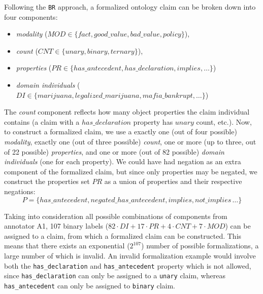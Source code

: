Following the \texttt{BR} approach, a formalized ontology claim can be broken
down into four components:
\begin{itemize}
	\item \emph{modality} ($\mathit{MOD} \in \{\mathit{fact},
		\mathit{good\_value}, \mathit{bad\_value}, \mathit{policy}\}$), 
	\item \emph{count} ($\mathit{CNT} \in \{\mathit{unary},
		\mathit{binary},  \mathit{ternary}\}$),
	\item \emph{properties} ($\mathit{PR} \in \{\mathit{has\_antecedent},
		\mathit{has\_declaration}, \mathit{implies}, \dots\}$)
	\item \emph{domain individuals} ($\mathit{DI} \in \{\mathit{marijuana},
		\mathit{legalized\_marijuana}, \mathit{mafia\_bankrupt},
		\dots\}$)
\end{itemize}
The \emph{count} component reflects how many object properties the claim individual
contains (a claim with a $\mathit{has\_declaration}$ property has $\mathit{unary}$ count, etc.).
Now, to construct a formalized claim, we use a exactly one (out of four
possible) \emph{modality}, exactly one (out of three possible) \emph{count},
one or more (up to three, out of 22 possible) \emph{properties}, and one
or more (out of 82 possible) \emph{domain individuals} (one for each property). 
We could have had negation as an extra component of the formalized claim, but
since only properties may be negated, we construct the properties set $PR$ as a
union of properties and their respective negations: 
$$
P = \{\mathit{has\_antecedent}, 
\mathit{negated\_has\_antecedent}, \mathit{implies}, \mathit{not\_implies}\, \dots\}
$$

Taking into consideration all possible combinations of components from
annotator A1, 107 binary labels ($82 \cdot \mathit{DI} + 17 \cdot \mathit{PR} + 4\cdot
\mathit{CNT} + 7 \cdot \mathit{MOD}$) can be assigned to a claim, from which a
formalized claim can be constructed.  This means that there  exists an
exponential ($2^{107}$) number of possible formalizations, a large number of
which is invalid.  An invalid formalization example would involve both the
\texttt{has\_declaration} and \texttt{has\_antecedent} property which is not allowed,
since \texttt{has\_declaration} can only be assigned to a \texttt{unary} claim,
whereas \texttt{has\_antecedent} can only be assigned to \texttt{binary} claim. 

